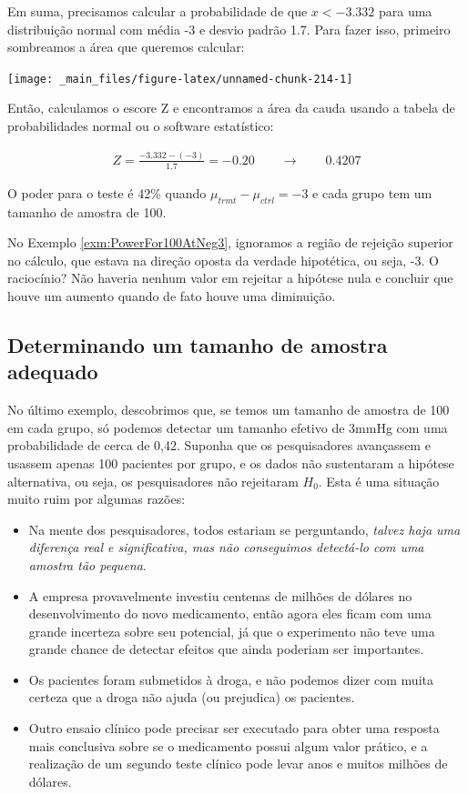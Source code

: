 \documentclass[
]{book}
\theoremstyle{definition}
\theoremstyle{definition}
\theoremstyle{definition}
\theoremstyle{definition}
\theoremstyle{remark}
\begin{document}
Em suma, precisamos calcular a probabilidade de que \(x < -3.332\) para uma distribuição normal com média -3 e desvio padrão 1.7. Para fazer isso, primeiro sombreamos a área que queremos calcular:

\texttt{[image: \_main\_files/figure-latex/unnamed-chunk-214-1]}

Então, calculamos o escore Z e encontramos a área da cauda usando a tabela de probabilidades normal ou o software estatístico:

\begin{align*}
Z = \frac{-3.332 - (-3)}{1.7} = -0.20 \qquad \to \qquad 0.4207
\end{align*}

O poder para o teste é 42\% quando \(\mu_{trmt} - \mu_{ctrl} = -3\) e cada grupo tem um tamanho de amostra de 100.

No Exemplo \ref{exm:PowerFor100AtNeg3}, ignoramos a região de rejeição superior no cálculo, que estava na direção oposta da verdade hipotética, ou seja, -3. O raciocínio? Não haveria nenhum valor em rejeitar a hipótese nula e concluir que houve um aumento quando de fato houve uma diminuição.

\hypertarget{determiningAppropriateSampleSize}{%
\subsection{Determinando um tamanho de amostra adequado}\label{determiningAppropriateSampleSize}}

No último exemplo, descobrimos que, se temos um tamanho de amostra de 100 em cada grupo, só podemos detectar um tamanho efetivo de 3mmHg com uma probabilidade de cerca de 0,42. Suponha que os pesquisadores avançassem e usassem apenas 100 pacientes por grupo, e os dados não sustentaram a hipótese alternativa, ou seja, os pesquisadores não rejeitaram \(H_0\). Esta é uma situação muito ruim por algumas razões:

\begin{itemize}
\item
  Na mente dos pesquisadores, todos estariam se perguntando, \emph{talvez haja uma diferença real e significativa, mas não conseguimos detectá-lo com uma amostra tão pequena}.
\item
  A empresa provavelmente investiu centenas de milhões de dólares no desenvolvimento do novo medicamento, então agora eles ficam com uma grande incerteza sobre seu potencial, já que o experimento não teve uma grande chance de detectar efeitos que ainda poderiam ser importantes.
\item
  Os pacientes foram submetidos à droga, e não podemos dizer com muita certeza que a droga não ajuda (ou prejudica) os pacientes.
\item
  Outro ensaio clínico pode precisar ser executado para obter uma resposta mais conclusiva sobre se o medicamento possui algum valor prático, e a realização de um segundo teste clínico pode levar anos e muitos milhões de dólares.
\end{itemize}
\end{document}
